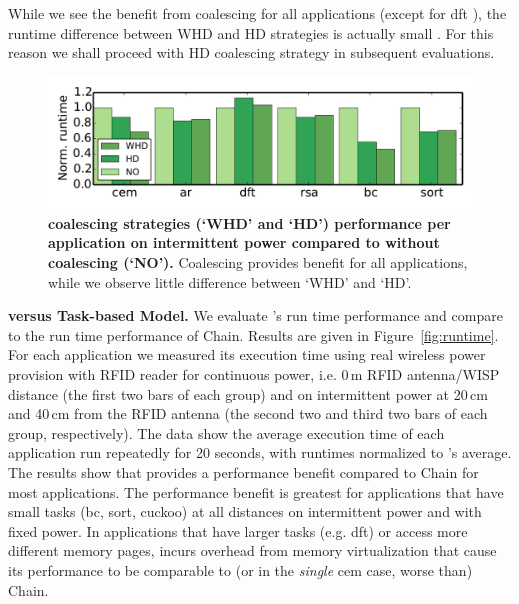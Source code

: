 While we see the benefit from coalescing for all applications (except for dft ), the runtime difference between WHD and HD strategies is actually small . For this reason we shall proceed with HD coalescing strategy in subsequent evaluations. 

\begin{figure}
	\centering
	\includegraphics[width=\columnwidth]{figures/coalStrategies}
	\caption{\textbf{\sys coalescing strategies (`WHD' and `HD') performance per application on intermittent power compared to \sys without coalescing (`NO').} Coalescing provides benefit for all applications, while we observe little difference between `WHD' and `HD'.}
	\label{fig:coalescing}
\end{figure}

\textbf{\sys versus Task-based Model.} We evaluate \sys's run time performance and compare \sys to the run time performance of Chain. Results are given in Figure~\ref{fig:runtime}. For each application we measured its execution time using real wireless power provision with RFID reader for continuous power, i.e. 0\,m RFID antenna/WISP distance (the first two bars of each group) and on intermittent power at 20\,cm and 40\,cm from the RFID antenna (the second two and third two bars of each group, respectively). The data show the average execution time of each application run repeatedly for 20 seconds, with runtimes normalized to \sys's average. The results show that \sys provides a performance benefit compared to Chain for most applications. The performance benefit is greatest for applications that have small tasks (bc, sort, cuckoo) at all distances on intermittent power and with fixed power. In applications that have larger tasks (e.g. dft) or access more different memory pages, \sys incurs overhead from memory virtualization that cause its performance to be comparable to (or in the \emph{single} cem case, worse than) Chain. 

